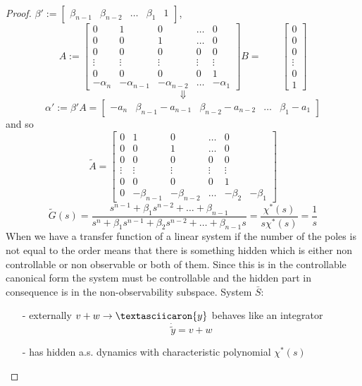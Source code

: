 \begin{proof}
$\beta':=\begin{bmatrix}
	\beta_{n-1} & \beta_{n-2} & \dots & \beta_1 & 1
\end{bmatrix}
$,
\[
A:=\begin{bmatrix}
	0 & 1 & 0 & \dots & 0 \\
	0 & 0 & 1 &  \dots & 0 \\
	0 & 0 & 0 & 0 & 0 \\
	\vdots& \vdots & \vdots & \vdots & \vdots \\
	0& 0 & 0 & 0 & 1 \\
	-\alpha_n &-\alpha_{n-1} & -\alpha_{n-2} & \dots & -\alpha_1 
	\end{bmatrix}B= \qquad\begin{bmatrix}
	0 \\
	0 \\
	0 \\
	\vdots \\
	0 \\
	1
\end{bmatrix}
\]\[\Downarrow\]\[\alpha':=\beta'A=\begin{bmatrix}
	-a_n & \beta_{n-1}-a_{n-1} & \beta_{n-2}-a_{n-2} & \dots & \beta_1 -a_1
\end{bmatrix}
\]and so
\[
\tilde{A}=\begin{bmatrix}
	0 & 1 & 0 & \dots & 0 \\
	0 & 0 & 1 &  \dots & 0 \\
	0 & 0 & 0 & 0 & 0 \\
	\vdots& \vdots & \vdots & \vdots & \vdots \\
	0& 0 & 0 & 0 & 1 \\
	0 & -\beta_{n-1} & -\beta_{n-2} & \dots & -\beta_2 & -\beta_1
\end{bmatrix}
\]
\[
\tilde{G}(s)=\frac{s^{n-1}+\beta_1s^{n-2}+\dots+\beta_{n-1}}{s^n+\beta_1s^{n-1}+\beta_2s^{n-2}+\dots+\beta_{n-1}s}=\frac{\chi^*(s)}{s\chi^*(s)}=\frac{1}{s}
\]When we have a transfer function of a linear system if the number of the poles is  not equal to the order means that there is something hidden which is either  non controllable or non observable or both of them.	Since this is in the controllable canonical form the system must be controllable and the hidden part in consequence is in the non-observability subspace.
System $\bar{S}$:
\begin{itemize}
	\item[-] externally $v+w\to\textasciicaron{y}$ behaves like an integrator \[\dot{\tilde{y}}=v+w\]
	\item[-] has hidden a.s. dynamics with characteristic polynomial $\chi^*(s)$
\end{itemize}
\end{proof}

